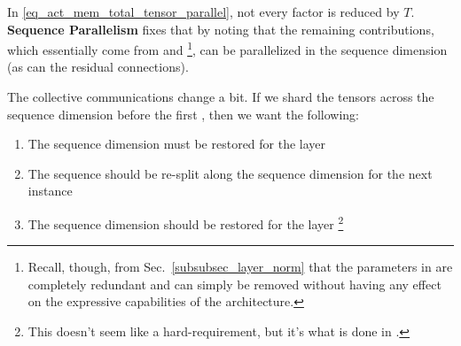 \documentclass[11pt]{article}
\begin{document}
In \eqref{eq_act_mem_total_tensor_parallel}, not every factor is reduced by $ T $. \textbf{Sequence
	Parallelism} fixes that by noting that the remaining contributions, which essentially come from
 and \footnote{Recall, though, from
	Sec.~\ref{subsubsec_layer_norm} that the parameters in  are completely redundant
	and can simply be removed without having any effect on the expressive capabilities of the
	architecture.}, can be parallelized in the sequence dimension (as can the residual connections).

The collective communications change a bit. If we shard the tensors across the sequence dimension
before the first , then we want the following:
\begin{enumerate}
	\item The sequence dimension must be restored for the  layer
	\item The sequence should be re-split along the sequence dimension for the next  instance
	\item The sequence dimension should be restored for the  layer \footnote{This doesn't
		      seem like a hard-requirement, but it's what is done in \cite{korthikanti2022reducing}.}
\end{enumerate}
\end{document}
